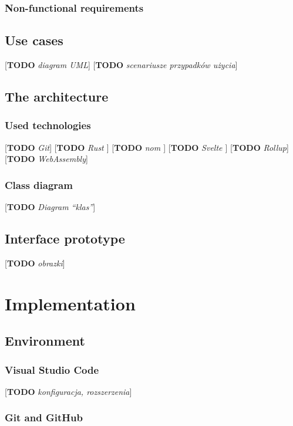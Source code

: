 \documentclass[english,engineering]{wizthesis}
\newcommand{\todo}[1]{{\color{red}[\textbf{TODO} \textit{#1}]}}
\begin{document}
\subsection{Non-functional requirements}

\section{Use cases}

\todo{diagram UML}
\todo{scenariusze przypadków użycia}

\section{The architecture}

\subsection{Used technologies}

\todo{Git}
\todo{Rust \cite{rust-book}}
\todo{nom \cite{couprie-2015}}
\todo{Svelte \cite{svelte-docs}}
\todo{Rollup}
\todo{WebAssembly}

\subsection{Class diagram}

\todo{Diagram ``klas''}

\section{Interface prototype}

\todo{obrazki}

\chapter{Implementation}

\section{Environment}

\subsection{Visual Studio Code}

\todo{konfiguracja, rozszerzenia}

\subsection{Git and GitHub}
\end{document}
